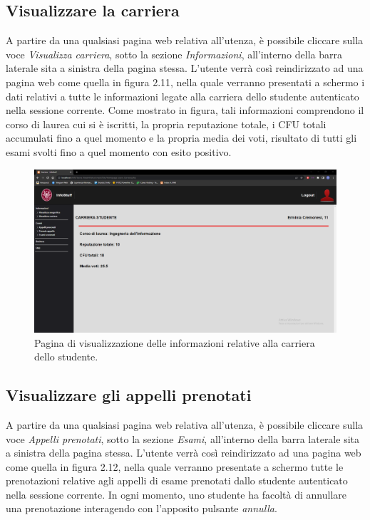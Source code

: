 \documentclass [a4paper,11pt]{book}
\begin{document}
\medskip

\subsection{Visualizzare la carriera}

A partire da una qualsiasi pagina web relativa all'utenza, è possibile cliccare sulla voce \emph{Visualizza carriera}, sotto la sezione \emph{Informazioni}, all'interno della barra laterale sita a sinistra della pagina stessa. L'utente verrà così reindirizzato ad una pagina web come quella in figura 2.11, nella quale verranno presentati a schermo i dati relativi a tutte le informazioni legate alla carriera dello studente autenticato nella sessione corrente. Come mostrato in figura, tali informazioni comprendono il corso di laurea cui si è iscritti, la propria reputazione totale, i CFU totali accumulati fino a quel momento e la propria media dei voti, risultato di tutti gli esami svolti fino a quel momento con esito positivo.

\begin{figure}
\centering
\includegraphics[scale=0.3]{figura2-11.png}
\caption{Pagina di visualizzazione delle informazioni relative alla carriera dello studente.}
\end{figure}

\medskip

\subsection{Visualizzare gli appelli prenotati}

A partire da una qualsiasi pagina web relativa all'utenza, è possibile cliccare sulla voce \emph{Appelli prenotati}, sotto la sezione \emph{Esami}, all'interno della barra laterale sita a sinistra della pagina stessa. L'utente verrà così reindirizzato ad una pagina web come quella in figura 2.12, nella quale verranno presentate a schermo tutte le prenotazioni relative agli appelli di esame prenotati dallo studente autenticato nella sessione corrente. In ogni momento, uno studente ha facoltà di annullare una prenotazione interagendo con l'apposito pulsante \emph{annulla}.
\end{document}
